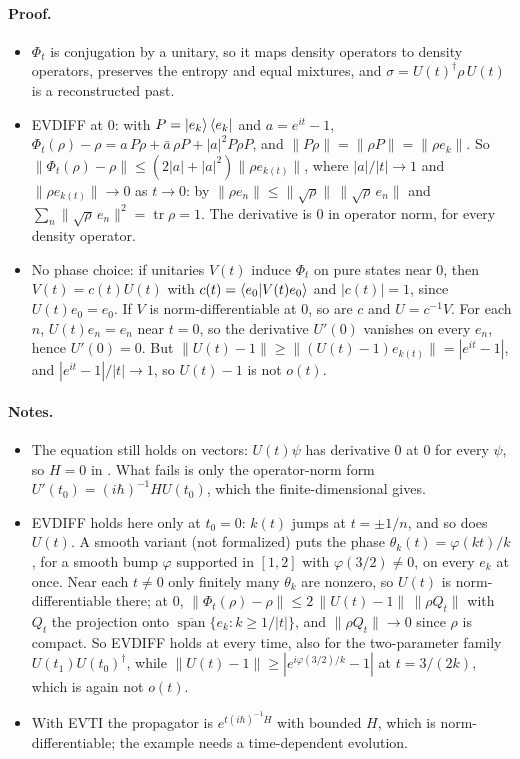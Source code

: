 \documentclass[11pt]{article}
\begin{document}
\paragraph{Proof.}
\begin{itemize}
\item $\Phi_t$ is conjugation by a unitary, so it maps density operators to density operators,
  preserves the entropy and equal mixtures, and $\sigma = U(t)^\dagger\rho\,U(t)$ is a
  reconstructed past.
\item EVDIFF at $0$: with $P = \ket{e_k}\bra{e_k}$ and $a = e^{it} - 1$,
  $\Phi_t(\rho) - \rho = a\,P\rho + \bar a\,\rho P + |a|^2 P\rho P$, and $\|P\rho\| =
  \|\rho P\| = \|\rho e_k\|$. So $\|\Phi_t(\rho) - \rho\| \le (2|a| + |a|^2)\|\rho e_{k(t)}\|$,
  where $|a|/|t| \to 1$ and $\|\rho e_{k(t)}\| \to 0$ as $t \to 0$: by
  $\|\rho e_n\| \le \|\sqrt\rho\|\,\|\sqrt\rho\, e_n\|$ and
  $\sum_n \|\sqrt\rho\, e_n\|^2 = \operatorname{tr}\rho = 1$. The derivative is $0$ in operator
  norm, for every density operator.
\item No phase choice: if unitaries $V(t)$ induce $\Phi_t$ on pure states near $0$, then
  $V(t) = c(t)U(t)$ with $c(t) = \braket{e_0|V(t)e_0}$ and $|c(t)| = 1$, since
  $U(t)e_0 = e_0$. If $V$ is norm-differentiable at $0$, so are $c$ and $U = c^{-1}V$. For each
  $n$, $U(t)e_n = e_n$ near $t = 0$, so the derivative $U'(0)$ vanishes on every $e_n$, hence
  $U'(0) = 0$. But $\|U(t) - 1\| \ge \|(U(t) - 1)e_{k(t)}\| = |e^{it} - 1|$, and
  $|e^{it} - 1|/|t| \to 1$, so $U(t) - 1$ is not $o(t)$.
\end{itemize}

\paragraph{Notes.}
\begin{itemize}
\item The equation still holds on vectors: $U(t)\psi$ has derivative $0$ at $0$ for every
  $\psi$, so $H = 0$ in . What fails is only the
  operator-norm form $U'(t_0) = (i\hbar)^{-1}HU(t_0)$, which the finite-dimensional
   gives.
\item EVDIFF holds here only at $t_0 = 0$: $k(t)$ jumps at $t = \pm 1/n$, and so does $U(t)$. A
  smooth variant (not formalized) puts the phase $\theta_k(t) = \varphi(kt)/k$, for a smooth bump
  $\varphi$ supported in $[1, 2]$ with $\varphi(3/2) \ne 0$, on every $e_k$ at once. Near each $t \ne 0$ only finitely
  many $\theta_k$ are nonzero, so $U(t)$ is norm-differentiable there; at $0$,
  $\|\Phi_t(\rho) - \rho\| \le 2\,\|U(t) - 1\|\,\|\rho Q_t\|$ with $Q_t$ the projection onto
  $\overline{\operatorname{span}}\{e_k : k \ge 1/|t|\}$, and $\|\rho Q_t\| \to 0$ since $\rho$ is
  compact. So EVDIFF holds at every time, also for the two-parameter family
  $U(t_1)U(t_0)^\dagger$, while $\|U(t) - 1\| \ge |e^{i\varphi(3/2)/k} - 1|$ at $t = 3/(2k)$, which
  is again not $o(t)$.
\item With EVTI the propagator is $e^{t(i\hbar)^{-1}H}$ with bounded $H$, which is
  norm-differentiable; the example needs a time-dependent evolution.
\end{itemize}
\end{document}
